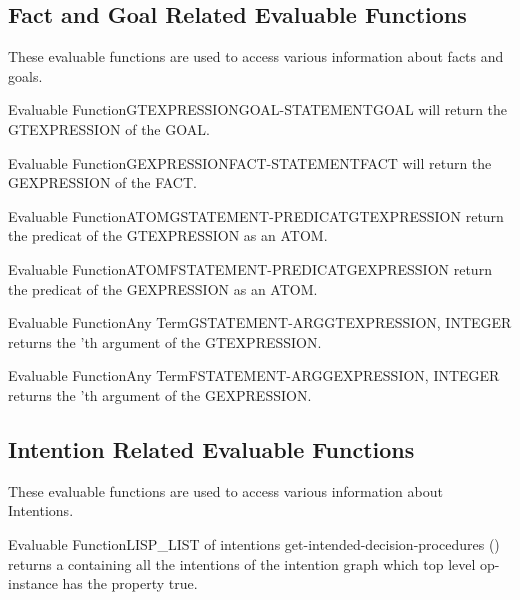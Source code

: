 \subsection{Fact and Goal Related Evaluable Functions}

These evaluable functions are used to access various information about facts
and goals.

\begin{typeefa}{Evaluable Function}{GTEXPRESSION}{GOAL-STATEMENT}{GOAL}
will return the GTEXPRESSION of the GOAL.
\end{typeefa}

\begin{typeefa}{Evaluable Function}{GEXPRESSION}{FACT-STATEMENT}{FACT}
will return the GEXPRESSION of the FACT.
\end{typeefa}

\begin{typeefa}{Evaluable Function}{ATOM}{GSTATEMENT-PREDICAT}{GTEXPRESSION}
return the predicat of the GTEXPRESSION as an ATOM.
\end{typeefa}

\begin{typeefa}{Evaluable Function}{ATOM}{FSTATEMENT-PREDICAT}{GEXPRESSION}
return the predicat of the GEXPRESSION as an ATOM.
\end{typeefa}

\begin{typeefa}{Evaluable Function}{Any Term}{GSTATEMENT-ARG}{GTEXPRESSION, INTEGER }
returns the 'th argument of the GTEXPRESSION.
\end{typeefa}

\begin{typeefa}{Evaluable Function}{Any Term}{FSTATEMENT-ARG}{GEXPRESSION, INTEGER
}
returns the 'th argument of the GEXPRESSION.
\end{typeefa}

\subsection{Intention Related Evaluable Functions}

These evaluable functions are used to access various information about Intentions.

\begin{typeefa}{Evaluable Function}{LISP\_LIST of intentions}
{get-intended-decision-procedures} {()} 
returns a  containing all the intentions of the intention graph
which top level op-instance has the property  true.
\end{typeefa}

